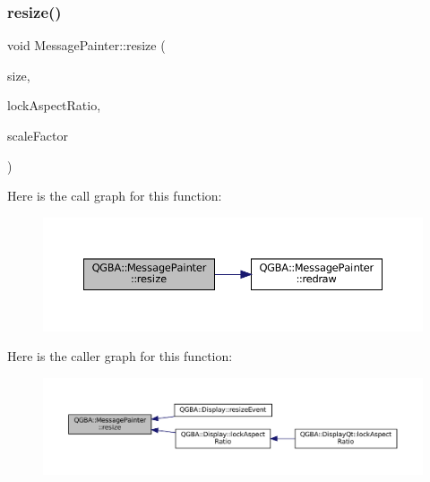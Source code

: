 \subsubsection{\texorpdfstring{resize()}{resize()}}
{\footnotesize\ttfamily void Message\+Painter\+::resize (\begin{DoxyParamCaption}\item[{const Q\+Size \&}]{size,  }\item[{\mbox{\hyperlink{libretro_8h_a4a26dcae73fb7e1528214a068aca317e}{bool}}}]{lock\+Aspect\+Ratio,  }\item[{qreal}]{scale\+Factor }\end{DoxyParamCaption})}

Here is the call graph for this function\+:
\nopagebreak
\begin{figure}[H]
\begin{center}
\leavevmode
\includegraphics[width=350pt]{class_q_g_b_a_1_1_message_painter_aa5b77ba11d3fb71e85765c279944495c_cgraph}
\end{center}
\end{figure}
Here is the caller graph for this function\+:
\nopagebreak
\begin{figure}[H]
\begin{center}
\leavevmode
\includegraphics[width=350pt]{class_q_g_b_a_1_1_message_painter_aa5b77ba11d3fb71e85765c279944495c_icgraph}
\end{center}
\end{figure}
\mbox{\label{class_q_g_b_a_1_1_message_painter_ae3c9b2709da7fdb9467c170da17bea26}} 
